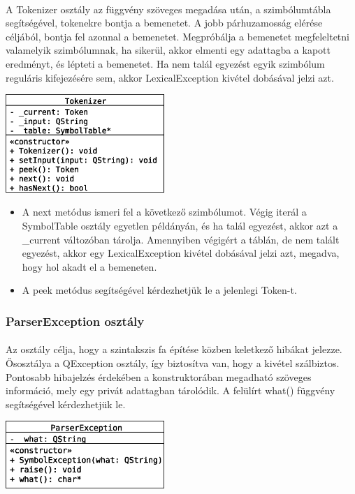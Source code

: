 \documentclass[12pt]{report}
\begin{document}
\paragraph{}
A Tokenizer osztály az függvény szöveges megadása után, a szimbólumtábla segítségével, tokenekre bontja a bemenetet. A jobb párhuzamosság elérése céljából, bontja fel azonnal a bemenetet. Megpróbálja a bemenetet megfeleltetni valamelyik szimbólumnak, ha sikerül, akkor elmenti egy adattagba a kapott eredményt, és lépteti a bemenetet. Ha nem talál egyezést egyik szimbólum reguláris kifejezésére sem, akkor LexicalException kivétel dobásával jelzi azt.
\begin{center}
\includegraphics[width=6cm]{pics/uml/Tokenizer}
\end{center}
\begin{itemize}
\item A next metódus ismeri fel a következő szimbólumot. Végig iterál a SymbolTable osztály egyetlen példányán, és ha talál egyezést, akkor azt a \_current változóban tárolja. Amennyiben végigért a táblán, de nem talált egyezést, akkor egy LexicalException kivétel dobásával jelzi azt, megadva, hogy hol akadt el a bemeneten.
\item A peek metódus segítségével kérdezhetjük le a jelenlegi Token-t.
\end{itemize}

\subsubsection{ParserException osztály}
\paragraph{}
Az osztály célja, hogy a szintakszis fa építése közben keletkező hibákat jelezze. Ősosztálya a QException osztály, így biztosítva van, hogy a kivétel szálbiztos. Pontosabb hibajelzés érdekében a konstruktorában megadható szöveges információ, mely egy privát adattagban tárolódik. A felülírt what() függvény segítségével kérdezhetjük le.
\begin{center}
\includegraphics[width=6cm]{pics/uml/ParserException}
\end{center}
\end{document}
